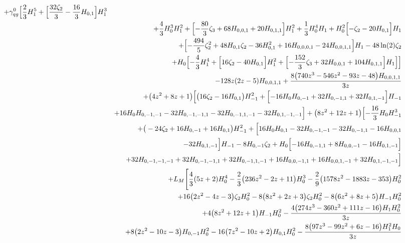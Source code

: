 \begin{eqnarray}
+{\gamma}_{qg}^{0} \Bigl[\frac{2}{3} H_1^5+\Bigl[\frac{32  \zeta_2}{3}-\frac{16}{3} H_{0,1}\Bigr] H_1^3
\nonumber \\ &&
+\frac{4}{3} H_0^3H_1^2+\Bigl[-\frac{80}{3} \zeta_3+68 H_{0,0,1}+20 H_{0,1,1}\Bigr]H_1^2+\frac{1}{3} H_0^4 H_1+H_0^2 \Bigl[-\zeta_2-20 H_{0,1}\Bigr]H_1
\nonumber \\ &&
+\Bigl[-\frac{494}{5} \zeta_2^2+48 H_{0,1} \zeta_2-36 H_{0,1}^2+16H_{0,0,0,1}-24 H_{0,0,1,1}\Bigr] H_1-48 \ln(2) \zeta_2
\nonumber \\ &&
+H_0\Bigl[-\frac{4}{3} H_1^4+\Bigl[16 \zeta_2-40 H_{0,1}\Bigr]H_1^2+\Bigl[-\frac{152}{3} \zeta_3+32 H_{0,0,1}+104 H_{0,1,1}\Bigr]H_1\Bigr]\Bigr]
\nonumber \\ &&
-128  z (2 z-5) H_{0,0,1,1}+\frac{8 \big(740 z^3-546 z^2-93  z-48\big) H_{0,0,1,1}}{3 z}
\nonumber \\ &&
+\big(4 z^2+8 z+1\big) \Bigl[\big(16 \zeta_2-16  H_{0,1}\big) H_{-1}^2+\Bigl[-16 H_0 H_{0,-1}
+32 H_{0,-1,1}
+32  H_{0,1,-1}\Bigr] H_{-1}
\nonumber \\ &&
+16 H_0 H_{0,-1,-1}-32 H_{0,-1,-1,1}-32  H_{0,-1,1,-1}
-32  H_{0,1,-1,-1}\Bigr]
+\big(8z^2+12 z+1\big) \Bigl[-\frac{16}{3} H_0 H_{-1}^3
\nonumber \\ &&
+\big(-24 \zeta_2+16H_{0,-1}+16 H_{0,1}\big) H_{-1}^2
+\Bigl[16  H_0 H_{0,1}-32 H_{0,-1,-1}-32H_{0,-1,1}-16  H_{0,0,1}
\nonumber \\ &&
-32 H_{0,1,-1}
\Bigr] H_{-1}
-8 H_{0,-1} \zeta_2
+H_0 \Bigl[-16  H_{0,-1,1}+8H_{0,0,-1}-16  H_{0,1,-1}\Bigr]
\nonumber \\ &&
+32 H_{0,-1,-1,-1}+32 H_{0,-1,-1,1}+32H_{0,-1,1,-1}+16  H_{0,0,-1,1}
+16 H_{0,0,1,-1}+32 H_{0,1,-1,-1}\Bigr]
\nonumber \\ &&
+L_M \Biggl[\frac{4}{3} (5 z+2) H_0^4-\frac{2}{3}\big(236 z^2-2 z+11\big) H_0^3-\frac{2}{9} \big(1578 z^2-1883 z-353\big)H_0^2
\nonumber \\ &&
+16 \big(2 z^2-4 z-3\big) \zeta_2 H_0^2-8  \big(8 z^2+2z+3\big) \zeta_2 H_0^2-8  \big(6 z^2+8 z+5\big) H_{-1} H_0^2
\nonumber \\ &&
+4\big(8 z^2+12 z+1\big) H_{-1} H_0^2-\frac{4 \big(274 z^3-360 z^2+111 z-16\big)  H_1 H_0^2}{3 z}
\nonumber \\ &&
+8  \big(2 z^2-10 z-3\big) H_{0,-1} H_0^2
-16 \big(7 z^2-10 z+2\big) H_{0,1} H_0^2-\frac{8 \big(97 z^3-99 z^2+6  z-16\big) H_1^2  H_0}{3 z}
\nonumber \\ &&

\end{eqnarray}
